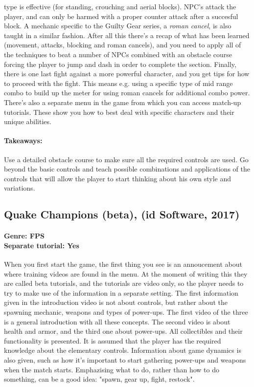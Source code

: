 type is effective (for standing, crouching and aerial blocks). NPC's attack
the player, and can only be harmed with a proper counter attack after a
succesful block. A mechanic specific to the Guilty Gear series, a \textit{roman cancel}, is also taught in a similar fashion.
After all this there's a recap of what has been learned (movement, attacks,
blocking and roman cancels), and you need to apply all of the techniques to
beat a number of NPCs combined with an obstacle course forcing the player to
jump and dash in order to complete the section. Finally, there is one last
fight against a more powerful character, and you get tips for how to proceed
with the fight. This means e.g. using a specific type of mid range combo to
build up the meter for using roman cancels for additional combo power.
There's also a separate menu in the game from which you can access match-up
tutorials. These show you how to best deal with specific characters and their
unique abilities.

\paragraph{Takeaways:}
Use a detailed obstacle course to make sure all the required controls are used.
Go beyond the basic controls and teach possible combinations and applications of the controls that will allow the player to start thinking about his own style and variations.

\subsection{Quake Champions (beta), (id Software, 2017)}
\paragraph{Genre: FPS \\ Separate tutorial: Yes \\}
When you first start the game, the first thing you see is an annoucement about
where training videos are found in the menu. At the moment of writing this
they are called beta tutorials, and the tutorials are video only, so the
player needs to try to make use of the information in a separate setting. The
first information given in the introduction video is not about controls, but
rather about the spawning mechanic, weapons and types of power-ups. The first
video of the three is a general introduction with all these concepts. The
second video is about health and armor, and the third one about power-ups.
All collectibles and their functionality is presented. It is assumed that the
player has the required knowledge about the elementary controls. Information about game dynamics is also given, such as how it's important to start gathering power-ups and weapons when the match starts. Emphazising what to do, rather than how to do something, can be a good idea: "spawn, gear up, fight, restock".
